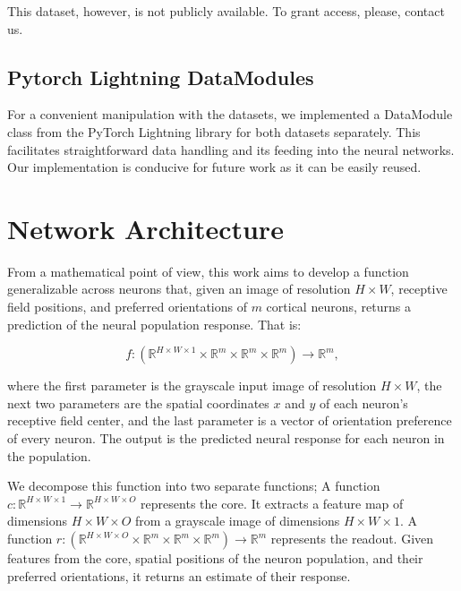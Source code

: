 This dataset, however, is not publicly available. To grant access, please, contact us.


\subsection{Pytorch Lightning DataModules}

For a convenient manipulation with the datasets, we implemented a DataModule class from the PyTorch Lightning library for both datasets separately. This facilitates straightforward data handling and its feeding into the neural networks. Our implementation is conducive for future work as it can be easily reused.

\section{Network Architecture}

From a mathematical point of view, this work aims to develop a function generalizable across neurons that, given an image of resolution $H \times W$, receptive field positions, and preferred orientations of $m$ cortical neurons, returns a prediction of the neural population response. That is:

\begin{equation}
f: (\mathbb{R}^{H \times W \times 1} \times \mathbb{R}^m  \times  \mathbb{R}^m  \times  \mathbb{R}^m) \to \mathbb{R}^m,
\end{equation}

where the first parameter is the grayscale input image of resolution $H \times W$, the next two parameters are the spatial coordinates $x$ and $y$ of each neuron’s receptive field center, and the last parameter is a vector of orientation preference of every neuron. The output is the predicted neural response for each neuron in the population.

\begin{sloppypar}
We decompose this function into two separate functions;
A function ${c: \mathbb{R}^{H \times W \times 1} \to \mathbb{R}^{H \times W \times O}}$ represents the core. It extracts a feature map of dimensions $H \times W \times O$ from a grayscale image of dimensions $H \times W \times 1$.
A function ${r: (\mathbb{R}^{H \times W \times O}  \times  \mathbb{R}^m  \times  \mathbb{R}^m  \times  \mathbb{R}^m) \to \mathbb{R}^m}$ represents the readout. Given features from the core, spatial positions of the neuron population, and their preferred orientations, it returns an estimate of their response.
\end{sloppypar}

